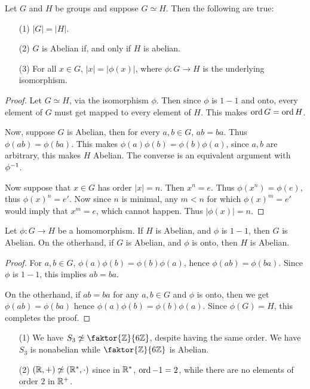 \begin{lemma}\label{lemma_1.5.3}
  Let $G$ and  $H$ be groups and suppose  $G \simeq H$. Then the following are
  true:
  \begin{enumerate}
    \item[(1)] $|G|=|H|$.

    \item[(2)] $G$ is Abelian if, and only if  $H$ is abelian.

    \item[(3)] For all $x \in G$, $|x|=|\phi(x)|$, where $\phi:G
      \xrightarrow{} H$ is the underlying isomorphism.
  \end{enumerate}
\end{lemma}
\begin{proof}
  Let $G \simeq H$,  via the isomorphism  $\phi$. Then since $\phi$ is  $1-1$
  and onto, every element of  $G$ must get mapped to every element of  $H$.
  This makes  $\operatorname{ord}{G}=\operatorname{ord}{H}$.

  Now, suppose $G$ is Abelian, then for every  $a, b \in G$,  $ab=ba$. Thus
  $\phi(ab)=\phi(ba)$. This makes $\phi(a)\phi(b)=\phi(b)\phi(a)$, since $a,b$
  are arbitrary, this makes  $H$ Abelian. The converse is an equivalent
  argument with  $\phi^{-1}$.

  Now suppose that $x \in G$ has order  $|x|=n$. Then $x^n=e$. Thus
  $\phi(x^n)=\phi(e)$, thus $\phi(x)^n=e'$. Now since $n$ is minimal, any
  $m<n$ for which  $\phi(x)^m=e'$ would imply that $x^m=e$, which cannot
  happen. Thus  $|\phi(x)|=n$.
\end{proof}
\begin{corollary}
  Let $\phi:G \rightarrow H$ be a homomorphism. If $H$ is Abelian, and  $\phi$
  is  $1-1$, then  $G$ is Abelian. On the otherhand, if  $G$ is Abelian, and
  $\phi$ is onto, then  $H$ is Abelian.
\end{corollary}
\begin{proof}
  For $a,b \in G$,  $\phi(a)\phi(b)=\phi(b)\phi(a)$, hence
  $\phi(ab)=\phi(ba)$. Since $\phi$ is  $1-1$, this implies  $ab=ba$.

  On the otherhand, if $ab=ba$ for any  $a,b \in G$ and  $\phi$ is onto, then
  we get  $\phi(ab)=\phi(ba)$ hence $\phi(a)\phi(b)=\phi(b)\phi(a)$. Since
  $\phi(G)=H$, this completes the proof.
\end{proof}

\begin{example}\label{example_1.13}
  \begin{enumerate}
    \item[(1)] We have $S_3 \not\simeq \faktor{\Z}{6\Z}$, despite having the
      same order. We have $S_3$ is nonabelian while  $\faktor{\Z}{6\Z}$ is
      Abelian.

    \item[(2)] $(\mathbb{R},+) \not\simeq (\mathbb{R}^*, \cdot)$ since in $\mathbb{R}^*$,
      $\operatorname{ord}{-1}=2$, while there are no elements of order $2$ in  $\mathbb{R}^+$.
  \end{enumerate}
\end{example}

